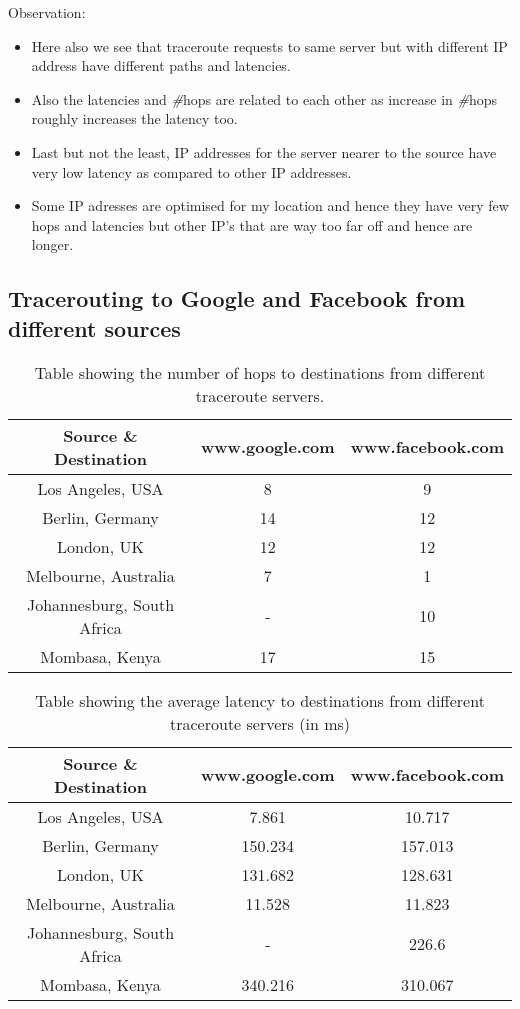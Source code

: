 \documentclass[11pt]{scrartcl}
\begin{document}
Observation:
\begin{itemize}
    \item Here also we see that traceroute requests to same server but with different IP address have different paths and latencies.
    \item Also the latencies and \textit{\#}hops are related to each other as increase in \textit{\#}hops roughly increases the latency too.
    \item Last but not the least, IP addresses for the server nearer to the source have very low latency as compared to other IP addresses.
    \item Some IP adresses are optimised for my location and hence they have very few hops and latencies but other IP's that are way too far off and hence are longer.
\end{itemize}


\subsection{Tracerouting to Google and Facebook from different sources}

\begin{table}[ht]
\centering
\begin{tabular}{|c|c|c|}
\hline
Source \& Destination & www.google.com & www.facebook.com \\
\hline
Los Angeles, USA & 8 & 9  \\
\hline
Berlin, Germany & 14 & 12 \\
\hline
London, UK &  12 & 12    \\
\hline
Melbourne, Australia & 7 & 1 \\
\hline
Johannesburg, South Africa & - & 10 \\
\hline
Mombasa, Kenya & 17 & 15 \\
\hline
\end{tabular}
\caption{Table showing the number of hops to destinations from different traceroute servers.}
\label{tab:simple}
\end{table}




\begin{table}[ht]
\centering
\begin{tabular}{|c|c|c|}
\hline
Source \& Destination & www.google.com & www.facebook.com \\
\hline
Los Angeles, USA & 7.861 & 10.717  \\
\hline
Berlin, Germany & 150.234 & 157.013 \\
\hline
London, UK &  131.682 & 128.631\\
\hline
Melbourne, Australia & 11.528 & 11.823 \\
\hline
Johannesburg, South Africa & - & 226.6 \\
\hline
Mombasa, Kenya & 340.216 & 310.067 \\
\hline
\end{tabular}
\caption{Table showing the average latency to destinations from different traceroute servers (in ms)}
\label{tab:simple}
\end{table}
\end{document}
